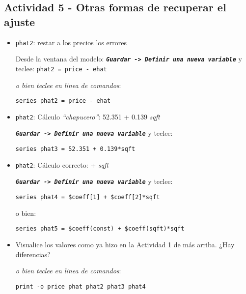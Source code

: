 \documentclass[11pt]{article}
\begin{document}
\subsection{Actividad 5 - Otras formas de recuperar el ajuste}
\label{sec:org3128734}
\begin{itemize}
\item \texttt{phat2}: restar a los precios los errores

Desde la ventana del modelo: \textbf{\emph{\texttt{Guardar -> Definir una nueva
  variable}}} y teclee:
\texttt{phat2 = price - ehat}

{\vspace{1pt} \footnotesize \color{gray!70!black} \color{gray!70!black}
\emph{o bien teclee en linea de comandos}:
\begin{verbatim}
series phat2 = price - ehat
\end{verbatim}
}

\item \texttt{phat2}: Cálculo \emph{``chapucero''}: 52.351 + 0.139 \emph{sqft}

\textbf{\emph{\texttt{Guardar -> Definir una nueva variable}}} y teclee:
{\vspace{1pt} \footnotesize \color{gray!70!black} \color{gray!70!black}
\begin{verbatim}
series phat3 = 52.351 + 0.139*sqft
\end{verbatim}
}

\item \texttt{phat2}: Cálculo correcto:  +  \emph{sqft}

\textbf{\emph{\texttt{Guardar -> Definir una nueva variable}}} y teclee:
{\vspace{1pt} \footnotesize \color{gray!70!black} \color{gray!70!black}
\begin{verbatim}
series phat4 = $coeff[1] + $coeff[2]*sqft
\end{verbatim}
}
o bien:
{\vspace{1pt} \footnotesize \color{gray!70!black} \color{gray!70!black}
\begin{verbatim}
series phat5 = $coeff(const) + $coeff(sqft)*sqft
\end{verbatim}
}

\item Visualice los valores como ya hizo en la Actividad 1 de más arriba. ¿Hay diferencias?

{\vspace{1pt} \footnotesize \color{gray!70!black} \color{gray!70!black}
\emph{o bien teclee en linea de comandos}:
\begin{verbatim}
print -o price phat phat2 phat3 phat4 
\end{verbatim}
}
\end{itemize}
\end{document}
